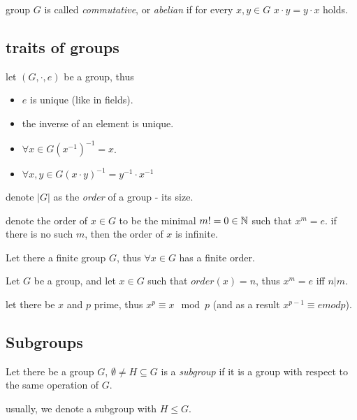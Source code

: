 \begin{defn}
    group $G$ is called \emph{commutative}, or \emph{abelian} if for every $x,y\in G$ $x\cdot y=y\cdot x$ holds.
\end{defn}

\subsection{traits of groups}
let $(G,\cdot,e)$ be a group, thus
\begin{itemize}
    \item $e$ is unique (like in fields).
    \item the inverse of an element is unique.
    \item $\forall x\in G (x^{-1})^{-1}=x$.
    \item $\forall x,y\in G (x\cdot y)^{-1}=y^{-1}\cdot x^{-1}$
\end{itemize}


\begin{defn}
    denote $|G|$ as the \emph{order} of a group - its size.
\end{defn}

\begin{defn}
    denote the order of $x\in G$ to be the minimal $m!=0\in\mathbb{N}$ such that  $x^m=e$. if there is no such $m$, then
    the order of $x$ is infinite.
\end{defn}

\begin{thm}
    Let there a finite group $G$, thus $\forall x\in G$ has a finite order.
\end{thm}

\begin{thm}
    Let $G$ be a group, and let $x\in G$ such that $order(x)=n$, thus $x^m=e$ iff $n|m$.
\end{thm}

\begin{thm}
    let there be $x$ and $p$ prime, thus $x^p \equiv x \mod p$
    (and as a result $x^{p-1}\equiv e mod p$).
\end{thm}

\subsection{Subgroups}

\begin{defn}
    Let there be a group $G$, $\emptyset \neq H\subseteq G$  is a \emph{subgroup} if it is a group
     with respect to the same operation of $G$.
\end{defn}
usually, we denote a subgroup with $H\le G$.

